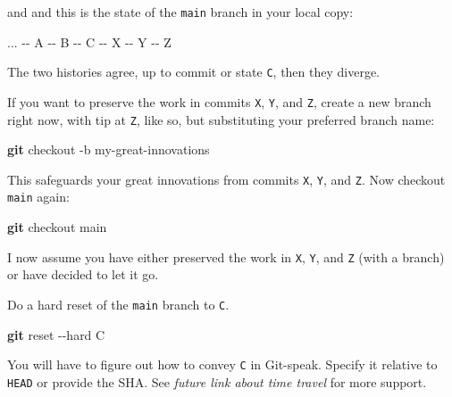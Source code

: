 \documentclass[
]{book}
\newenvironment{Shaded}{\begin{snugshade}}{\end{snugshade}}
\newcommand{\AttributeTok}[1]{\textcolor[rgb]{0.13,0.29,0.53}{#1}}
\newcommand{\ExtensionTok}[1]{#1}
\newcommand{\FunctionTok}[1]{\textcolor[rgb]{0.13,0.29,0.53}{\textbf{#1}}}
\newcommand{\NormalTok}[1]{#1}
\begin{document}
and and this is the state of the \texttt{main} branch in your local copy:

\begin{Shaded}
\begin{Highlighting}[]
\ExtensionTok{...} \AttributeTok{{-}{-}}\NormalTok{ A }\AttributeTok{{-}{-}}\NormalTok{ B }\AttributeTok{{-}{-}}\NormalTok{ C }\AttributeTok{{-}{-}}\NormalTok{ X }\AttributeTok{{-}{-}}\NormalTok{ Y }\AttributeTok{{-}{-}}\NormalTok{ Z}
\end{Highlighting}
\end{Shaded}

The two histories agree, up to commit or state \texttt{C}, then they diverge.

If you want to preserve the work in commits \texttt{X}, \texttt{Y}, and \texttt{Z}, create a new branch right now, with tip at \texttt{Z}, like so, but substituting your preferred branch name:

\begin{Shaded}
\begin{Highlighting}[]
\FunctionTok{git}\NormalTok{ checkout }\AttributeTok{{-}b}\NormalTok{ my{-}great{-}innovations}
\end{Highlighting}
\end{Shaded}

This safeguards your great innovations from commits \texttt{X}, \texttt{Y}, and \texttt{Z}.
Now checkout \texttt{main} again:

\begin{Shaded}
\begin{Highlighting}[]
\FunctionTok{git}\NormalTok{ checkout main}
\end{Highlighting}
\end{Shaded}

I now assume you have either preserved the work in \texttt{X}, \texttt{Y}, and \texttt{Z} (with a branch) or have decided to let it go.

Do a hard reset of the \texttt{main} branch to \texttt{C}.

\begin{Shaded}
\begin{Highlighting}[]
\FunctionTok{git}\NormalTok{ reset }\AttributeTok{{-}{-}hard}\NormalTok{ C}
\end{Highlighting}
\end{Shaded}

You will have to figure out how to convey \texttt{C} in Git-speak.
Specify it relative to \texttt{HEAD} or provide the SHA.
See \emph{future link about time travel} for more support.
\end{document}
